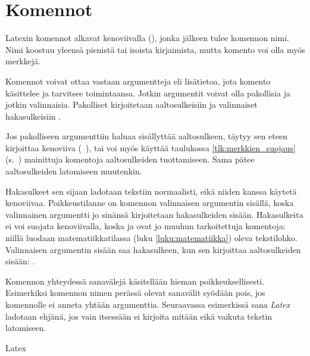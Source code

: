 \section{Komennot}
\label{luku:komennot}

Latexin komennot alkavat kenoviivalla (\koodi{\textbackslash}), jonka
jälkeen tulee komennon nimi. Nimi koostuu yleensä pienistä tai isoista
kirjaimista, mutta komento voi olla myös merkkejä.

Komennot voivat ottaa vastaan argumentteja eli lisätietoa, jota komento
käsittelee ja tarvitsee toimintaansa. Jotkin argumentit voivat olla
pakollisia ja jotkin valinnaisia. Pakolliset kirjoitetaan
aaltosulkeisiin \koodi{\{\ldots\}} ja valinnaiset hakasulkeisiin
\koodi{[\ldots]}.

\begin{koodilohkosis}
  \komento
\end{koodilohkosis}

Jos pakolliseen argumenttiin haluaa sisällyttää aaltosulkeen, täytyy sen
eteen kirjoittaa kenoviiva (\koodi{\keno\{}~\koodi{\keno\}}), tai voi
myös käyttää taulukossa \ref{tlk:merkkien_suojaus}
(s.~\pageref{tlk:merkkien_suojaus}) mainittuja komentoja aaltosulkeiden
tuottamiseen. Sama pätee aaltosulkeiden latomiseen muutenkin.

Hakasulkeet sen sijaan ladotaan tekstiin normaalisti, eikä niiden kanssa
käytetä kenoviivaa. Poikkeustilanne on komennon valinnaisen argumentin
sisällä, koska valinnainen argumentti jo sinänsä kirjoitetaan
hakasulkeiden sisään. Hakasulkeita ei voi suojata kenoviivalla, koska
\koodi{\keno[} ja \koodi{\keno]} ovat jo muuhun tarkoitettuja komentoja:
niillä luodaan matematiikkatilassa (luku \ref{luku:matematiikka}) oleva
tekstilohko. Valinnaisen argumentin sisään saa hakasulkeen, kun sen
kirjoittaa aaltosulkeiden sisään: \koodi{\keno komento[\{]\}]}.

Komennon yhteydessä sanavälejä käsitellään hieman poikkeuksellisesti.
Esimerkiksi komennon nimen perässä olevat sanavälit syödään pois, jos
komennolle ei anneta yhtään argumenttia. Seuraavassa esimerkissä sana
\emph{Latex} ladotaan ehjänä, jos vain 
itsessään ei kirjoita mitään eikä vaikuta tekstin latomiseen.


\begin{koodilohkosis}
  La\komento   tex
\end{koodilohkosis}

